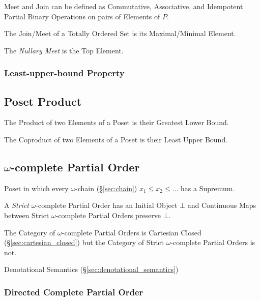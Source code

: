 Meet and Join can be defined as Commutative, Associative, and
Idempotent Partial Binary Operations on pairs of Elements of $P$.

The Join/Meet of a Totally Ordered Set is its Maximal/Minimal Element.

The \emph{Nullary Meet} is the Top Element.



\subsubsection{Least-upper-bound Property}\label{sec:leastupperbound_property}



\subsection{Poset Product}\label{sec:poset_product}

The Product of two Elements of a Poset is their Greatest Lower Bound.

The Coproduct of two Elements of a Poset is their Least Upper Bound.



\subsection{$\omega$-complete Partial Order}\label{sec:omega_cpo}

Poset in which every $\omega$-chain (\S\ref{sec:chain}) $x_1 \leq x_2
\leq \ldots$ has a Supremum.

A \emph{Strict} $\omega$-complete Partial Order has an Initial Object
$\bot$ and Continuous Maps between Strict $\omega$-complete Partial
Orders preserve $\bot$.

The Category of $\omega$-complete Partial Orders is Cartesian Closed
(\S\ref{sec:cartesian_closed}) but the Category of Strict
$\omega$-complete Partial Orders is not.

Denotational Semantics (\S\ref{sec:denotational_semantics})



\subsubsection{Directed Complete Partial Order}\label{sec:dcpo}



